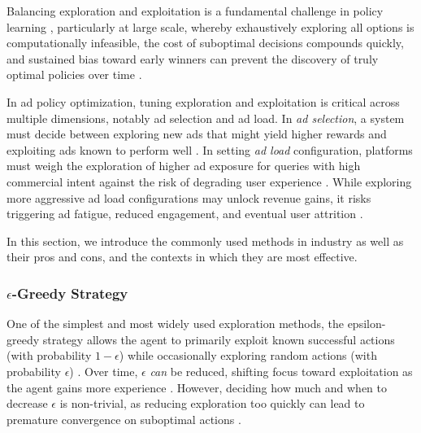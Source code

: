 \documentclass[manuscript,review,screen]{acmart}
\begin{document}
Balancing exploration and exploitation is a fundamental challenge in policy learning \cite{Sutton1998}, particularly at large scale, whereby exhaustively exploring all options is computationally infeasible, the cost of suboptimal decisions compounds quickly, and sustained bias toward early winners can prevent  the discovery of truly optimal policies over time \cite{dulac2021challenges}.

In ad policy optimization, tuning exploration and exploitation is critical across multiple dimensions, notably ad selection and ad load. In \textit{ad selection}, a system must decide between exploring new ads that might yield higher rewards and exploiting ads known to perform well \cite{russo2018tutorial, auer2002finite, bietti2021contextual}. In setting \textit{ad load} configuration, platforms must weigh the exploration of higher ad exposure for queries with high commercial intent against the risk of degrading user experience \cite{zhang2018whole, carrion2021blending, hohnhold2015focusing}. While exploring more aggressive ad load configurations may unlock revenue gains, it risks triggering ad fatigue, reduced engagement, and eventual user attrition \cite{silberstein2023combating, sagtani2023quantifying}. 

In this section, we introduce the commonly used methods in industry as well as their pros and cons,  and the contexts in which they are most effective.

\subsubsection{\textbf{\texorpdfstring{$\epsilon$}{epsilon}-Greedy Strategy}}

One of the simplest and most widely used exploration methods, the epsilon-greedy strategy allows the agent to primarily exploit known successful actions (with probability $1 - \epsilon$) while occasionally exploring random actions (with probability $\epsilon$) \cite{Sutton1998}. Over time, $\epsilon$ \textit{can} be reduced, shifting focus toward exploitation as the agent gains more experience \cite{russo2018tutorial}. However, deciding how much and when to decrease $\epsilon$ is non-trivial, as reducing exploration too quickly can lead to premature convergence on suboptimal actions \cite{dulac2021challenges}. 
    
\end{document}
